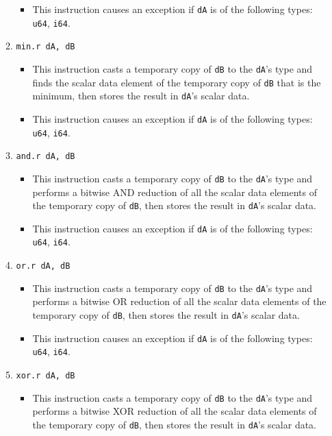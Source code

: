 \documentclass{article}
\begin{document}
\begin{itemize}
\begin{enumerate}
\begin{itemize}
				\item This instruction causes an exception if \texttt{dA}
				is of the following types:  \texttt{u64}, \texttt{i64}.
				\end{itemize}
			\item \texttt{min.r dA, dB}
				\begin{itemize}
				\item This instruction casts a temporary copy of
				\texttt{dB} to the \texttt{dA}'s type and finds the scalar
				data element of the temporary copy of \texttt{dB} that is
				the minimum, then stores the result in \texttt{dA}'s scalar
				data.

				\item This instruction causes an exception if \texttt{dA}
				is of the following types:  \texttt{u64}, \texttt{i64}.
				\end{itemize}

			\item \texttt{and.r dA, dB}
				\begin{itemize}
				\item This instruction casts a temporary copy of
				\texttt{dB} to the \texttt{dA}'s type and performs a
				bitwise AND reduction of all the scalar data elements of
				the temporary copy of \texttt{dB}, then stores the result
				in \texttt{dA}'s scalar data.

				\item This instruction causes an exception if \texttt{dA}
				is of the following types:  \texttt{u64}, \texttt{i64}.
				\end{itemize}
			\item \texttt{or.r dA, dB}
				\begin{itemize}
				\item This instruction casts a temporary copy of
				\texttt{dB} to the \texttt{dA}'s type and performs a
				bitwise OR reduction of all the scalar data elements of the
				temporary copy of \texttt{dB}, then stores the result in
				\texttt{dA}'s scalar data.

				\item This instruction causes an exception if \texttt{dA}
				is of the following types:  \texttt{u64}, \texttt{i64}.
				\end{itemize}
			\item \texttt{xor.r dA, dB}
				\begin{itemize}
				\item This instruction casts a temporary copy of
				\texttt{dB} to the \texttt{dA}'s type and performs a
				bitwise XOR reduction of all the scalar data elements of
				the temporary copy of \texttt{dB}, then stores the result
				in \texttt{dA}'s scalar data.


\end{itemize}
\end{enumerate}
\end{itemize}
\end{document}
